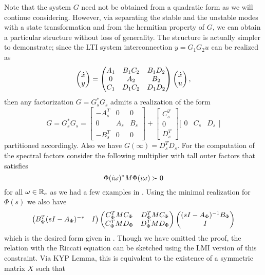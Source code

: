 Note that the system $G$ need not be obtained from a quadratic form as we will continue considering. However, via separating
the stable and the unstable modes with a state transformation and from the hermitian property of $G$, we can obtain a particular 
structure without loss of generality. The structure is actually simpler to demonstrate; since the LTI system interconnection 
$y=G_1G_2 u$ can be realized as
\begin{equation}
\begin{pmatrix}\dot{x}\\y\end{pmatrix} = \begin{pmatrix}A_1 &B_1C_2 &B_1D_2\\0 &A_2 &B_2\\C_1 &D_1C_2 &D_1D_2\end{pmatrix}\begin{pmatrix}\dot{x}\\u\end{pmatrix},
\end{equation}
then any factorization $G = G_s^*G_s$ admits a realization of the form
\begin{equation}
G = G_s^*G_s = \left[
\begin{array}{cc|c}
-A_s^T &0 &0\\0 &A_s &B_s\\\hline -B_s^T &0 &0	
\end{array}\right]+
\left[
\begin{array}{c}
C_s^T \\ 0 \\\hline D_s^T
\end{array}
\right]
\bigg[
\begin{array}{cc|c}
0 &C_s &D_s
\end{array}
\bigg]
\end{equation}
partitioned accordingly. Also we have $G(\infty)= D_s^TD_s$. For the computation of the spectral factors 
consider the following multiplier with tall outer factors that satisfies
\[
\Phi(i\omega)^*M\Phi(i\omega) \succ 0
\]
for all $\omega\in\mathbb{R}_e$ as we had a few examples in . Using the minimal realization for $\Phi(s)$ we also have
\begin{equation}
\begin{pmatrix}B_{\Phi}^T(sI-A_{\Phi})^{-*}&I\end{pmatrix}
\begin{pmatrix}C_{\Phi}^TMC_{\Phi}&D_{\Phi}^TMC_{\Phi}\\C_{\Phi}^TMD_{\Phi}&D_{\Phi}^TMD_{\Phi}\end{pmatrix}
\begin{pmatrix}(sI-A_{\Phi})^{-1}B_{\Phi}\\I\end{pmatrix}
\label{eq:specfactshuffle}
\end{equation} which is the desired form given in . Though we have omitted the proof, the relation with the 
Riccati equation can be sketched using the LMI version of this constraint. Via KYP Lemma, this is equivalent to the existence 
of a symmetric matrix $X$ such that 
